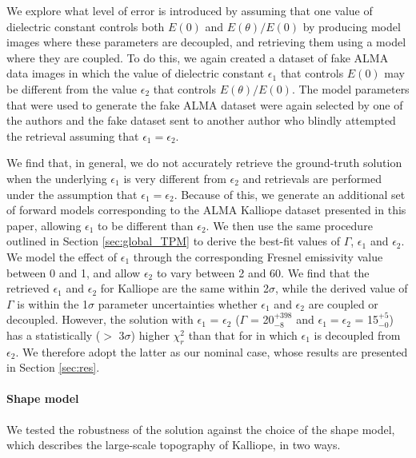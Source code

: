 \documentclass[]{aastex631}
\begin{document}
We explore what level of error is introduced by assuming that one value of dielectric constant controls both $E(0)$ and $E({\theta})/E({0})$ by producing model images where these parameters are decoupled, and retrieving them using a model where they are coupled. To do this, we again created a dataset of fake ALMA data images in which the value of dielectric constant $\epsilon_1$ that controls $E({0})$ may be different from the value $\epsilon_2$ that controls $E({\theta})/E({0})$. The model parameters that were used to generate the fake ALMA dataset were again selected by one of the authors and the fake dataset sent to another author who blindly attempted the retrieval assuming that $\epsilon_1=\epsilon_2$. 

We find that, in general, we do not accurately retrieve the ground-truth solution when the underlying $\epsilon_1$ is very different from $\epsilon_2$ and retrievals are performed under the assumption that $\epsilon_1=\epsilon_2$. Because of this, we generate an additional set of forward models corresponding to the ALMA Kalliope dataset presented in this paper, allowing $\epsilon_1$ to be different than $\epsilon_2$. We then use the same procedure outlined in Section \ref{sec:global_TPM} to derive the best-fit values of $\Gamma$, $\epsilon_1$ and $\epsilon_2$. We model the effect of $\epsilon_1$ through the corresponding Fresnel emissivity value between 0 and 1, and allow $\epsilon_2$ to vary between 2 and 60. We find that the retrieved $\epsilon_1$ and $\epsilon_2$ for Kalliope are the same within 2$\sigma$, while the derived value of $\Gamma$ is within the 1$\sigma$ parameter uncertainties whether $\epsilon_1$ and $\epsilon_2$ are coupled or decoupled. However, the solution with $\epsilon_1$ = $\epsilon_2$ ($\Gamma$ = 20$^{+398}_{-8}$ and $\epsilon_1=\epsilon_2$ = 15$^{+5}_{-0}$) has a statistically ($>$ 3$\sigma$) higher $\chi_r^2$ than that for in which $\epsilon_1$ is decoupled from $\epsilon_2$. We therefore adopt the latter as our nominal case, whose results are presented in Section \ref{sec:res}.

\paragraph{Shape model}

We tested the robustness of the solution against the choice of the shape model, which describes the large-scale topography of Kalliope, in two ways. 
\end{document}
